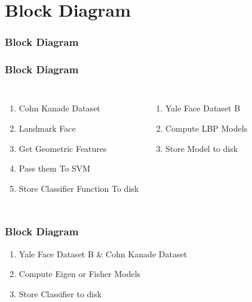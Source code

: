 \documentclass{beamer}
\begin{document}
	
	
	\section{Block Diagram}
	
	\begin{frame}
		
		\frametitle{Block Diagram}
	\end{frame}	
	
	\begin{frame}		
		\frametitle{Block Diagram}
		
		\begin{columns}[t]
			
		\begin{enumerate}
			\item Cohn Kanade Dataset
			\item Landmark Face
			\item Get Geometric Features
			\item Pass them To SVM
			\item Store Classifier Function To disk
		\end{enumerate}
		
		
		
		\begin{enumerate}
			\item Yale Face Dataset B
			\item Compute LBP Models
			\item Store Model to disk
		\end{enumerate}
		
		\end{columns}	
		
	\end{frame}
	
	\begin{frame}
		
		\frametitle{Block Diagram}
		\begin{enumerate}
			\item Yale Face Dataset B \& Cohn Kanade Dataset
			\item Compute Eigen or Fisher Models
			\item Store Classifier to disk
		\end{enumerate}
		
		
	\end{frame}
	
\end{document}

